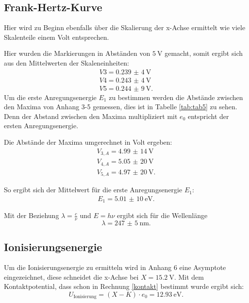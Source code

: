 \subsection{Frank-Hertz-Kurve}
Hier wird zu Beginn ebenfalls über die Skalierung der x-Achse ermittelt wie viele
Skalenteile einem Volt entsprechen.

Hier wurden die Markierungen in Abständen von $\SI{5}{\V}$ gemacht, somit ergibt
sich aus den Mittelwerten der Skaleneinheiten:
\begin{align*}
  V3=\SI{0,239(4)}{\V}\\
  V4=\SI{0,243(4)}{\V}\\
  V5=\SI{0,244(9)}{\V}.
\end{align*}
Um die erste Anregungsenergie $E_1$ zu bestimmen werden die Abstände zwischen den
Maxima von Anhang 3-5 gemessen, dies ist in Tabelle \ref{tab:tab5} zu sehen.
Denn der Abstand zwischen den Maxima multipliziert mit
$e_0$ entspricht der ersten Anregungsenergie.

Die Abstände der Maxima umgerechnet in Volt ergeben:
\begin{align*}
  V_{3,A}=\SI{4,99(14)}{\V}\\
  V_{4,A}=\SI{5,05(20)}{\V}\\
  V_{5,A}=\SI{4,97(20)}{\V}.
\end{align*}

So ergibt sich der Mittelwert für die erste Anregungsenergie $E_1$:
\begin{align*}
  E_1=\SI{5,01(10)}{\eV}.
\end{align*}

Mit der Beziehung $\lambda=\frac{c}{\nu}$ und $E=h\nu$ ergibt sich für die Wellenlänge
\begin{equation}
  \lambda=\SI{247(5)}{\nm}.
\end{equation}

\subsection{Ionisierungsenergie}
Um die Ionisierungsenergie zu ermitteln wird in Anhang 6 eine Asymptote eingezeichnet,
diese schneidet die x-Achse bei $X=\SI{15,2}{\V}$.
Mit dem Kontaktpotential, dass schon in Rechnung \ref{kontakt} bestimmt
wurde ergibt sich:
\begin{equation}
  U_{\text{Ionisierung}}=(X-K)\cdot e_0=\SI{12,93}{\eV}.
\end{equation}
